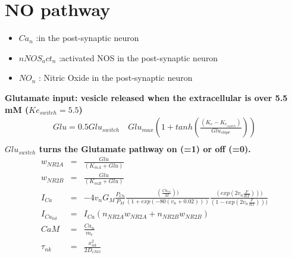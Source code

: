 \documentclass[fleqn]{report}
\numberwithin{equation}{section}
\numberwithin{equation}{section}
\newcommand{\K}{\text{K$^+$}}
\newcommand{\Ca}{\text{Ca$^{2+}$}}
\begin{document}
				            \section{NO pathway} 
				            \begin{itemize}
				   				 \item           $Ca_n$ :\Ca in the post-synaptic neuron                  
				   				  \item          $nNOS_act_n$ :activated NOS in the post-synaptic neuron
				   				  \item          $NO_n$ : Nitric Oxide in the post-synaptic neuron
				            \end{itemize}

				            
				                        \textbf{ Glutamate input: vesicle released when the extracellular \K is over 5.5 mM ($Ke_{switch}=5.5$) \\}
				                                     \begin{eqnarray}
				                                     Glu = 0.5 Glu_{switch} \quad Glu_{max}  ( 1 + tanh(  \frac{(K_e - K_{e_{switch}})}{Glu_{slope}}))\\  %
				                                     \end{eqnarray}
				                                     \textbf{$Glu_{switch}$ turns the  Glutamate pathway on (=1) or off (=0). }
				                          \begin{eqnarray}
				                         w_{NR2A} &=& \frac{Glu}{(K_{mA} + Glu)}\\%
				                         w_{NR2B} &=& \frac{Glu}{(K_{mB} + Glu)}\\%
				                         I_{Ca} &=& -4 v_n  G_M \frac{P_{Ca}}{P_{M}}  \frac{( \frac{Ca_{ex}}{M}))}{(1 + exp(-80 (v_n + 0.02)))} \frac{(exp(2 v_n \frac{F}{RT})))}{(1 - exp(2 v_n \frac{F}{RT})))} \\ %
				                         I_{Ca_{tot}} &=& I_{Ca} (n_{NR2A}  w_{NR2A} + n_{NR2B}  w_{NR2B})\\ %
				                         CaM &=& \frac{Ca_{n}}{ m_{c}}\\ %
				                         \tau_{nk} &=&  \frac{x_{nk} ^ 2}{2  D_{cNO}}\\ %
				            \end{eqnarray}
\end{document}
